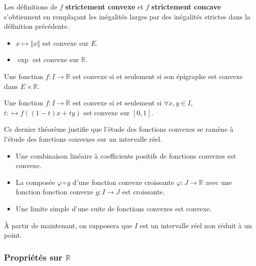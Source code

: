 	\begin{remark}
		Les définitions de $f$ \textbf{strictement convexe} et $f$ \textbf{strictement concave} s'obtiennent en remplaçant les inégalités larges par des inégalités strictes dans la définition précédente.
	\end{remark}

	\begin{example}
		\begin{itemize}
			\item $x \mapsto \Vert x \Vert$ est convexe sur $E$.
			\item $\exp$ est convexe sur $\mathbb{R}$.
		\end{itemize}
	\end{example}

	\begin{proposition}
		Une fonction $f : I \rightarrow \mathbb{R}$ est convexe si et seulement si son épigraphe est convexe dans $E \times \mathbb{R}$.
	\end{proposition}

	\begin{theorem}
		Une fonction $f : I \rightarrow \mathbb{R}$ est convexe si et seulement si $\forall x, y \in I$, $t : \mapsto f((1-t)x + ty)$ est convexe sur $[0,1]$.
	\end{theorem}

	Ce dernier théorème justifie que l'étude des fonctions convexes se ramène à l'étude des fonctions convexes sur un intervalle réel.

	\begin{proposition}
		\begin{itemize}
			\item Une combinaison linéaire à coefficients positifs de fonctions convexes est convexe.
			\item La composée $\varphi \circ g$ d'une fonction convexe croissante $\varphi : J \rightarrow \mathbb{R}$ avec une fonction fonction convexe $g : I \rightarrow J$ est croissante.
			\item Une limite simple d'une suite de fonctions convexes est convexe.
		\end{itemize}
	\end{proposition}

	À partir de maintenant, on supposera que $I$ est un intervalle réel non réduit à un point.

	\subsubsection{Propriétés sur \texorpdfstring{$\mathbb{R}$}{R}}


